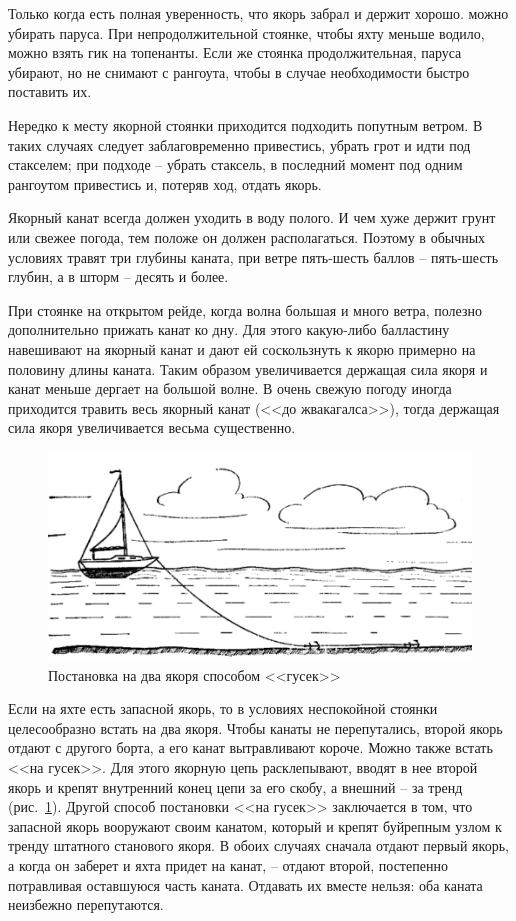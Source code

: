 \documentclass[a4paper, 12pt, twoside, final]{scrbook}
\begin{document}
Только когда есть полная уверенность, что якорь забрал и держит хорошо. можно убирать паруса. При непродолжительной стоянке, чтобы яхту меньше водило, можно взять гик на топенанты. Если же стоянка продолжительная, паруса убирают, но не снимают с рангоута, чтобы в случае необходимости быстро поставить их.

Нередко к месту якорной стоянки приходится подходить попутным ветром. В таких случаях следует заблаговременно привестись, убрать грот и идти под стакселем; при подходе \--- убрать стаксель, в последний момент под одним рангоутом привестись и, потеряв ход, отдать якорь.

Якорный канат всегда должен уходить в воду полого. И чем хуже держит грунт или свежее погода, тем положе он должен располагаться. Поэтому в обычных условиях травят три глубины каната, при ветре пять\--шесть баллов \--- пять\--шесть глубин, а в шторм \--- десять и более.

При стоянке на открытом рейде, когда волна большая и много ветра, полезно дополнительно прижать канат ко дну. Для этого какую-либо балластину навешивают на якорный канат и дают ей соскользнуть к якорю примерно на половину длины каната. Таким образом увеличивается держащая сила якоря и канат меньше дергает на большой волне. В очень свежую погоду иногда приходится травить весь якорный канат (<<до жвакагалса>>), тогда держащая сила якоря увеличивается весьма существенно.

\begin{figure}[htbp]
   \centering
   \includegraphics{129_Postanovka_na_gusek} %
   \caption{Постановка на два якоря способом <<гусек>>}
   \label{fig:129}
\end{figure}

Если на яхте есть запасной якорь, то в условиях неспокойной стоянки целесообразно встать на два якоря. Чтобы канаты не перепутались, второй якорь отдают с другого борта, а его канат вытравливают короче. Можно также встать <<на гусек>>. Для этого якорную цепь расклепывают, вводят в нее второй якорь и крепят внутренний конец цепи за его скобу, а внешний \--- за тренд (рис.~\ref{fig:129}). Другой способ постановки <<на гусек>> заключается в том, что запасной якорь вооружают своим канатом, который и крепят буйрепным узлом к тренду штатного станового якоря. В обоих случаях сначала отдают первый якорь, а когда он заберет и яхта придет на канат, \--- отдают второй, постепенно потравливая оставшуюся часть каната. Отдавать их вместе нельзя: оба каната неизбежно перепутаются.
\end{document}
